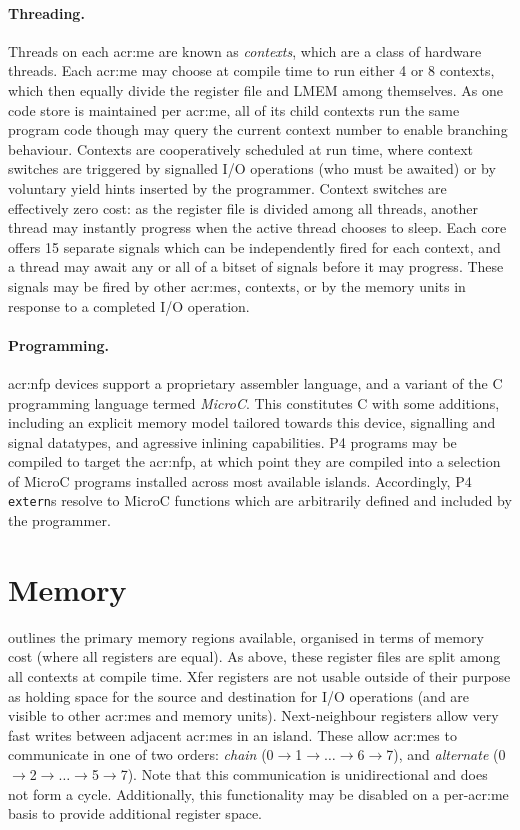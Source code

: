 \paragraph{Threading.}
Threads on each \gls{acr:me} are known as \emph{contexts}, which are a class of hardware threads.
Each \gls{acr:me} may choose at compile time to run either 4 or 8 contexts, which then equally divide the register file and LMEM among themselves.
As one code store is maintained per \gls{acr:me}, all of its child contexts run the same program code though may query the current context number to enable branching behaviour.
Contexts are cooperatively scheduled at run time, where context switches are triggered by signalled I/O operations (who must be awaited) or by voluntary yield hints inserted by the programmer.
Context switches are effectively zero cost: as the register file is divided among all threads, another thread may instantly progress when the active thread chooses to sleep.
Each core offers \num{15} separate signals which can be independently fired for each context, and a thread may await any or all of a bitset of signals before it may progress.
These signals may be fired by other \glspl{acr:me}, contexts, or by the memory units in response to a completed I/O operation.

\paragraph{Programming.}
\gls{acr:nfp} devices support a proprietary assembler language, and a variant of the C programming language termed \emph{MicroC}.
This constitutes C with some additions, including an explicit memory model tailored towards this device, signalling and signal datatypes, and agressive inlining capabilities.
P4 programs may be compiled to target the \gls{acr:nfp}, at which point they are compiled into a selection of MicroC programs installed across most available islands.
Accordingly, P4 \texttt{extern}s resolve to MicroC functions which are arbitrarily defined and included by the programmer.

\section{Memory}
 outlines the primary memory regions available, organised in terms of memory cost (where all registers are equal).
As above, these register files are split among all contexts at compile time.
Xfer registers are not usable outside of their purpose as holding space for the source and destination for I/O operations (and are visible to other \glspl{acr:me} and memory units).
Next-neighbour registers allow very fast writes between adjacent \glspl{acr:me} in an island.
These allow \glspl{acr:me} to communicate in one of two orders: \emph{chain} (0$\rightarrow$1$\rightarrow\dots\rightarrow$6$\rightarrow$7), and \emph{alternate} (0$\rightarrow$2$\rightarrow\dots\rightarrow$5$\rightarrow$7).
Note that this communication is unidirectional and does not form a cycle.
Additionally, this functionality may be disabled on a per-\gls{acr:me} basis to provide additional register space.

